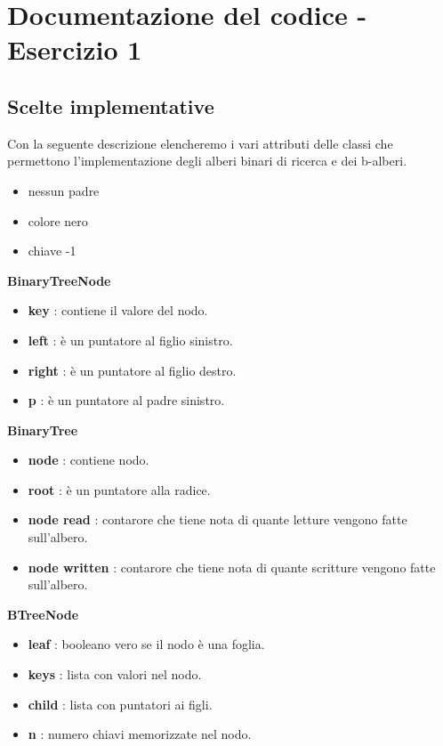\newpage
\section{Documentazione del codice - Esercizio 1}

\subsection{Scelte implementative}
\label{sec:ScelteImplementative_1}
Con la seguente descrizione elencheremo i vari attributi delle classi che permettono l'implementazione degli alberi binari di ricerca e dei b-alberi.

\begin{itemize}
    \item nessun padre
    \item colore nero
    \item chiave -1
\end{itemize}

\item \textbf{BinaryTreeNode}
    \begin{itemize}
        \item \textbf{key} : contiene il valore del nodo.
        \item \textbf{left} : è un puntatore al figlio sinistro.
        \item \textbf{right} : è un puntatore al figlio destro.
        \item \textbf{p} : è un puntatore al padre sinistro.
    \end{itemize}

\item \textbf{BinaryTree}
    \begin{itemize}
        \item \textbf{node} : contiene nodo.
        \item \textbf{root} : è un puntatore alla radice.
        \item \textbf{node read} : contarore che tiene nota di quante letture vengono fatte sull'albero.
        \item \textbf{node written} : contarore che tiene nota di quante scritture vengono fatte sull'albero.
    \end{itemize}

\item \textbf{BTreeNode}
    \begin{itemize}
        \item \textbf{leaf} : booleano vero se il nodo è una foglia.
        \item \textbf{keys} : lista con valori nel nodo.
        \item \textbf{child} : lista con puntatori ai figli.
        \item \textbf{n} : numero chiavi memorizzate nel nodo.
    \end{itemize}

